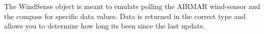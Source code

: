 \documentclass[letterpaper]{article}
\begin{document}
%

The WindSense object is meant to emulate polling the AIRMAR wind-sensor and the compass for specific data values. Data is returned in the correct type and allows you to determine how long its been since the last update.
\end{document}
